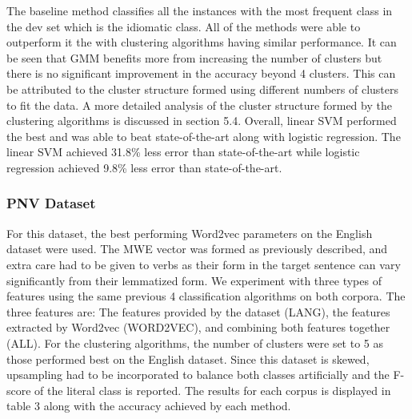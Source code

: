 \documentclass[11pt]{article}
\begin{document}
The baseline method classifies all the instances with the most frequent class in the dev set which is the idiomatic class. All of the methods were able to outperform it the with clustering algorithms having similar performance. It can be seen that GMM benefits more from increasing the number of clusters but there is no significant improvement in the accuracy beyond 4 clusters. This can be attributed to the cluster structure formed using different numbers of clusters to fit the data. A more detailed analysis of the cluster structure formed by the clustering algorithms is discussed in section 5.4. Overall, linear SVM performed the best and was able to beat state-of-the-art along with logistic regression. The linear SVM achieved 31.8\% less error than state-of-the-art while logistic regression achieved 9.8\% less error than state-of-the-art.  

\subsubsection{PNV Dataset}



For this dataset, the best performing Word2vec parameters on the English dataset were used. The MWE vector was formed as previously described, and extra care had to be given to verbs as their form in the target sentence can vary significantly from their lemmatized form. We experiment with three types of features using the same previous 4 classification algorithms on both corpora. The three features are: The features provided by the dataset (LANG), the features extracted by Word2vec (WORD2VEC), and combining both features together (ALL). For the clustering algorithms, the number of clusters were set to 5 as those performed best on the English dataset. Since this dataset is skewed, upsampling had to be incorporated to balance both classes artificially and  the F-score of the literal class is reported. The results for each corpus is displayed in table 3 along with the accuracy achieved by each method.
\end{document}
